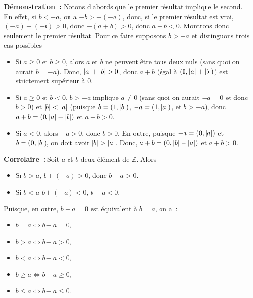 \medskip

\noindent\textbf{Démonstration :} Notons d'abords que le premier résultat implique le second. 
    En effet, si $b < -a$, on a $-b > -(-a)$, donc, si le premier résultat est vrai, $(-a) + (-b) > 0$, donc $- (a+b) > 0$, donc $a + b < 0$.
    Montrons donc seulement le premier résultat. 
    Pour ce faire supposons $b > -a$ et distinguons trois cas possibles : 
    \begin{itemize}[nosep]
        \item Si $a \geq 0$ et $b \geq 0$, alors $a$ et $b$ ne peuvent être tous deux nuls (sans quoi on aurait $b = -a$).
            Donc, $\left\lvert a \right\rvert + \left\lvert b \right\rvert > 0$, donc $a + b$ (égal à $(0, \left\lvert a \right\rvert + \left\lvert b \right\rvert)$) est strictement supérieur à $0$.
        \item Si $a \geq 0$ et $b < 0$, $b > -a$ implique $a \neq 0$ (sans quoi on aurait $-a = 0$ et donc $b > 0$) et $\left\lvert b \right\rvert < \left\lvert a \right\rvert$ (puisque $b = (1, \left\lvert b \right\rvert)$, $-a = (1, \left\lvert a \right\rvert)$, et $b > -a$), donc $a + b = (0, \left\lvert a \right\rvert - \left\lvert b \right\rvert)$ et $a-b > 0$.
        \item Si $a < 0$, alors $-a > 0$, donc $b > 0$. 
            En outre, puisque $-a = (0, \left\lvert a \right\rvert)$ et $b = (0, \left\lvert b \right\rvert)$, on doit avoir $\left\lvert b \right\rvert > \left\lvert a \right\rvert$. 
            Donc, $a + b = (0, \left\lvert b \right\rvert - \left\lvert a \right\rvert)$ et $a + b > 0$.
    \end{itemize}

    \done

\medskip

\noindent\textbf{Corrolaire :} Soit $a$ et $b$ deux élément de $\mathbb{Z}$. 
    Alors 
    \begin{itemize}[nosep]
        \item Si $b > a$, $b + (-a) > 0$, donc $b - a > 0$.
        \item Si $b < a$ $b + (-a) < 0$, $b - a < 0$.
    \end{itemize}
    Puisque, en outre, $b - a = 0$ est équivalent à $b = a$, on a : 
    \begin{itemize}[nosep]
        \item $b = a \Leftrightarrow b - a = 0$,
        \item $b > a \Leftrightarrow b - a > 0$,
        \item $b < a \Leftrightarrow b - a < 0$,
        \item $b \geq a \Leftrightarrow b - a \geq 0$,
        \item $b \leq a \Leftrightarrow b - a \leq 0$.
    \end{itemize}

